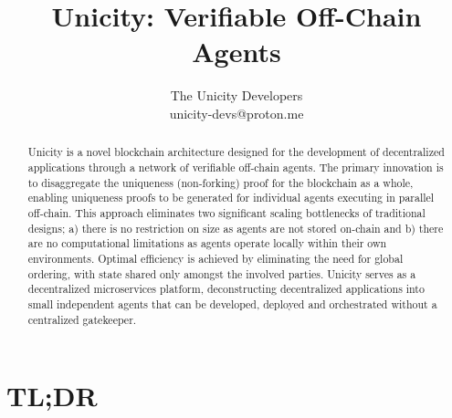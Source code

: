 \documentclass{article}
\title{Unicity: Verifiable Off-Chain Agents}
\author{The Unicity Developers\\unicity-devs@proton.me}
\date{}
\begin{document}
\maketitle

\begin{abstract}

\noindent
Unicity is a novel blockchain architecture designed for the development of decentralized applications through a network of verifiable off-chain agents. The primary innovation is to disaggregate the uniqueness (non-forking) proof for the blockchain as a whole, enabling uniqueness proofs to be generated for individual agents executing in parallel off-chain. This approach eliminates two significant scaling bottlenecks of traditional designs; a) there is no restriction on size as agents are not stored on-chain and b) there are no computational limitations as agents operate locally within their own environments. Optimal efficiency is achieved by eliminating the need for global ordering, with state shared only amongst the involved parties. Unicity serves as a decentralized microservices platform, deconstructing decentralized applications into small independent agents that can be developed, deployed and orchestrated without a centralized gatekeeper.

\end{abstract}


\section*{TL;DR}
\end{document}
